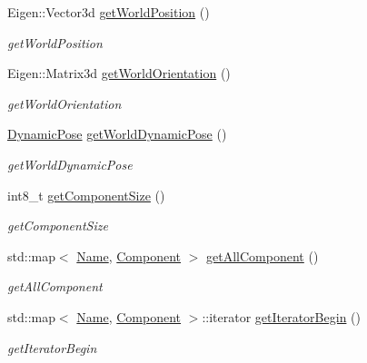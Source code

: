 \begin{DoxyCompactItemize}
Eigen\+::\+Vector3d \hyperlink{classrobotis__manipulator_1_1_manipulator_a1a06d64bbc395207454a949fa297690d}{get\+World\+Position} ()
\begin{DoxyCompactList}\small\item\em get\+World\+Position \end{DoxyCompactList}\item 
Eigen\+::\+Matrix3d \hyperlink{classrobotis__manipulator_1_1_manipulator_a01ce8a2bf764dc82c5db428fbed8c078}{get\+World\+Orientation} ()
\begin{DoxyCompactList}\small\item\em get\+World\+Orientation \end{DoxyCompactList}\item 
\hyperlink{structrobotis__manipulator_1_1_dynamic_pose}{Dynamic\+Pose} \hyperlink{classrobotis__manipulator_1_1_manipulator_a8ecb51f08b72848c6471b8ca1aae7306}{get\+World\+Dynamic\+Pose} ()
\begin{DoxyCompactList}\small\item\em get\+World\+Dynamic\+Pose \end{DoxyCompactList}\item 
int8\+\_\+t \hyperlink{classrobotis__manipulator_1_1_manipulator_a2bf9733c62dc10fffce7756d7c2761ec}{get\+Component\+Size} ()
\begin{DoxyCompactList}\small\item\em get\+Component\+Size \end{DoxyCompactList}\item 
std\+::map$<$ \hyperlink{namespacerobotis__manipulator_a08c2d25e77a01ad75b9bb740f8ce4765}{Name}, \hyperlink{structrobotis__manipulator_1_1_component}{Component} $>$ \hyperlink{classrobotis__manipulator_1_1_manipulator_ad15f38d8421fd4ce11ca71527475bbaf}{get\+All\+Component} ()
\begin{DoxyCompactList}\small\item\em get\+All\+Component \end{DoxyCompactList}\item 
std\+::map$<$ \hyperlink{namespacerobotis__manipulator_a08c2d25e77a01ad75b9bb740f8ce4765}{Name}, \hyperlink{structrobotis__manipulator_1_1_component}{Component} $>$\+::iterator \hyperlink{classrobotis__manipulator_1_1_manipulator_a83e1adbb8c496ebf785311c8aab2b9ad}{get\+Iterator\+Begin} ()
\begin{DoxyCompactList}\small\item\em get\+Iterator\+Begin \end{DoxyCompactList}\item 

\end{DoxyCompactItemize}
